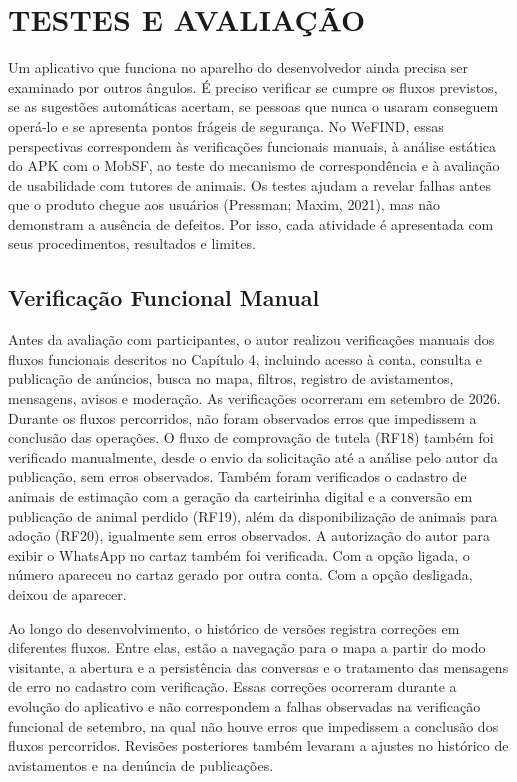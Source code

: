 \section{TESTES E AVALIAÇÃO}
\setcounter{quadro}{4}

Um aplicativo que funciona no aparelho do desenvolvedor ainda precisa ser examinado por outros ângulos. É preciso verificar se cumpre os fluxos previstos, se as sugestões automáticas acertam, se pessoas que nunca o usaram conseguem operá-lo e se apresenta pontos frágeis de segurança. No WeFIND, essas perspectivas correspondem às verificações funcionais manuais, à análise estática do APK com o MobSF, ao teste do mecanismo de correspondência e à avaliação de usabilidade com tutores de animais. Os testes ajudam a revelar falhas antes que o produto chegue aos usuários (Pressman; Maxim, 2021), mas não demonstram a ausência de defeitos. Por isso, cada atividade é apresentada com seus procedimentos, resultados e limites.

\subsection{Verificação Funcional Manual}

Antes da avaliação com participantes, o autor realizou verificações manuais dos fluxos funcionais descritos no Capítulo 4, incluindo acesso à conta, consulta e publicação de anúncios, busca no mapa, filtros, registro de avistamentos, mensagens, avisos e moderação. As verificações ocorreram em setembro de 2026. Durante os fluxos percorridos, não foram observados erros que impedissem a conclusão das operações. O fluxo de comprovação de tutela (RF18) também foi verificado manualmente, desde o envio da solicitação até a análise pelo autor da publicação, sem erros observados. Também foram verificados o cadastro de animais de estimação com a geração da carteirinha digital e a conversão em publicação de animal perdido (RF19), além da disponibilização de animais para adoção (RF20), igualmente sem erros observados. A autorização do autor para exibir o WhatsApp no cartaz também foi verificada. Com a opção ligada, o número apareceu no cartaz gerado por outra conta. Com a opção desligada, deixou de aparecer.

Ao longo do desenvolvimento, o histórico de versões registra correções em diferentes fluxos. Entre elas, estão a navegação para o mapa a partir do modo visitante, a abertura e a persistência das conversas e o tratamento das mensagens de erro no cadastro com verificação. Essas correções ocorreram durante a evolução do aplicativo e não correspondem a falhas observadas na verificação funcional de setembro, na qual não houve erros que impedissem a conclusão dos fluxos percorridos. Revisões posteriores também levaram a ajustes no histórico de avistamentos e na denúncia de publicações.

